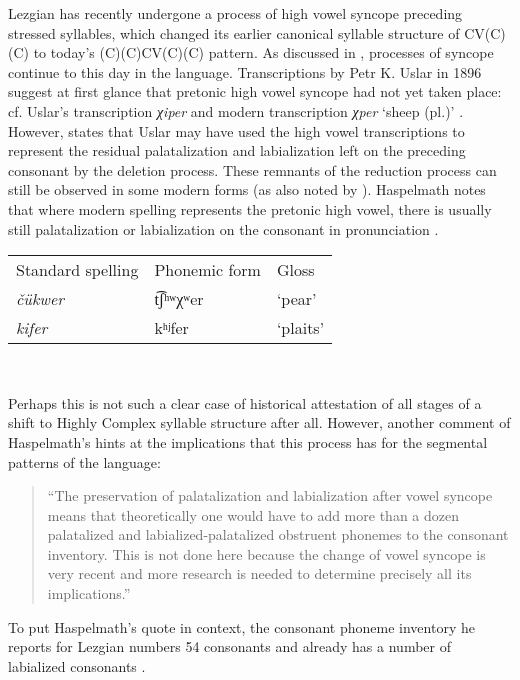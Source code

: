   Lezgian has recently undergone a process of high vowel syncope preceding stressed syllables, which changed its earlier canonical syllable structure of CV(C)(C) to today’s (C)(C)CV(C)(C) pattern. As discussed in , processes of syncope continue to this day in the language. Transcriptions by Petr K. Uslar in 1896 suggest at first glance that pretonic high vowel syncope had not yet taken place: cf. Uslar’s transcription \textit{χiper} and modern transcription \textit{χper} ‘sheep (pl.)’ \citep[36]{Haspelmath1993}. However, \citet[56]{Haspelmath1993} states that Uslar may have used the high vowel transcriptions to represent the residual palatalization and labialization left on the preceding consonant by the deletion process. These remnants of the reduction process can still be observed in some modern forms (as also noted by \citealt{ChitoranBabaliyeva2007}). Haspelmath notes that where modern spelling represents the pretonic high vowel, there is usually still palatalization or labialization on the consonant in pronunciation .

\ea\label{ex:8.3}
\begin{tabular}{@{}lll@{}}
Standard spelling & Phonemic form & Gloss\\
\textit{čükwer}   &   t͡ʃʰʷχʷer  &  ‘pear’\\
\textit{kifer}   &   kʰʲfer    &   ‘plaits’\\
\end{tabular}\\
\citep[37]{Haspelmath1993}
\z

Perhaps this is not such a clear case of historical attestation of all stages of a shift to Highly Complex syllable structure after all. However, another comment of Haspelmath’s hints at the implications that this process has for the segmental patterns of the language:

\begin{quote}
“The preservation of palatalization and labialization after vowel syncope means that theoretically one would have to add more than a dozen palatalized and labialized-palatalized obstruent phonemes to the consonant inventory. This is not done here because the change of vowel syncope is very recent and more research is needed to determine precisely all its implications.”
\citep[38]{Haspelmath1993}
\end{quote}

To put Haspelmath’s quote in context, the consonant phoneme inventory he reports for Lezgian numbers 54 consonants and already has a number of labialized consonants .

